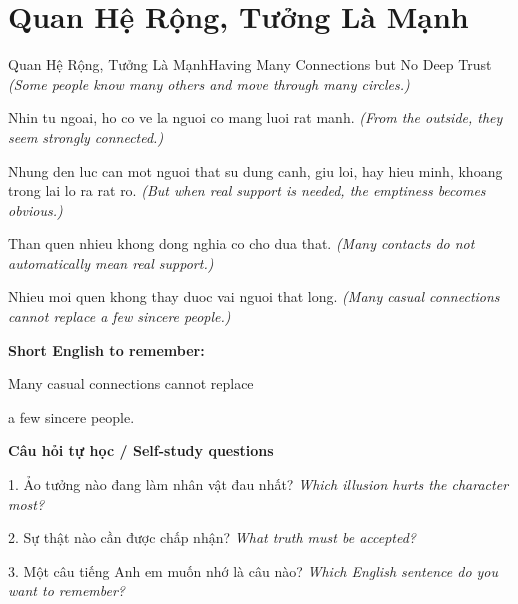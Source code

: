 \section{Quan Hệ Rộng, Tưởng Là Mạnh}
\begin{truyen}{Quan Hệ Rộng, Tưởng Là Mạnh}{Having Many Connections but No Deep Trust}
\textit{(Some people know many others and move through many circles.)}

Nhin tu ngoai, ho co ve la nguoi co mang luoi rat manh.
\textit{(From the outside, they seem strongly connected.)}

Nhung den luc can mot nguoi that su dung canh, giu loi, hay hieu minh, khoang trong lai lo ra rat ro.
\textit{(But when real support is needed, the emptiness becomes obvious.)}

Than quen nhieu khong dong nghia co cho dua that.
\textit{(Many contacts do not automatically mean real support.)}

\end{truyen}

\begin{baihoc}
Nhieu moi quen khong thay duoc vai nguoi that long.
\textit{(Many casual connections cannot replace a few sincere people.)}
\end{baihoc}

\begin{ghinhoanh}
\textbf{Short English to remember:}

Many casual connections cannot replace

a few sincere people.

\end{ghinhoanh}

\begin{tuhocnhanh}
\textbf{Câu hỏi tự học / Self-study questions}

1. Ảo tưởng nào đang làm nhân vật đau nhất? \textit{Which illusion hurts the character most?}

2. Sự thật nào cần được chấp nhận? \textit{What truth must be accepted?}

3. Một câu tiếng Anh em muốn nhớ là câu nào? \textit{Which English sentence do you want to remember?}
\end{tuhocnhanh}
\ngancach

